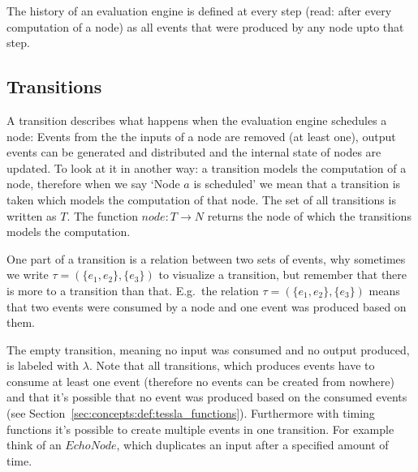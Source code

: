 The history of an evaluation engine is defined at every step (read: after every computation of a node) as all events that were produced by any node upto that step.

\subsection{Transitions}
\label{sec:concepts:defs:transitions}

A transition describes what happens when the evaluation engine schedules a node:
Events from the the inputs of a node are removed (at least one), output events can be generated and distributed and the internal state of nodes are updated.
To look at it in another way: a transition models the computation of a node, therefore when we say `Node \(a\) is scheduled' we mean that a transition is taken which models the computation of that node.
The set of all transitions is written as \(T\).
The function \(\mathit{node} : T \rightarrow N\) returns the node of which the transitions models the computation.

One part of a transition is a relation between two sets of events, why sometimes we write \(\tau = (\{e_1, e_2\}, \{e_3\})\) to visualize a transition, but remember that there is more to a transition than that.
E.g.\ the relation \(\tau = (\{e_1,e_2\}, \{e_3\})\) means that two events were consumed by a node and one event was produced based on them.

The empty transition, meaning no input was consumed and no output produced, is labeled with \(\lambda\).
Note that all transitions, which produces events have to consume at least one event (therefore no events can be created from nowhere) and that it's possible that no event was produced based on the consumed events (see Section~\ref{sec:concepts:def:tessla_functions}).
Furthermore with timing functions it's possible to create multiple events in one transition.
For example think of an \(\mathit{EchoNode}\), which duplicates an input after a specified amount of time.

